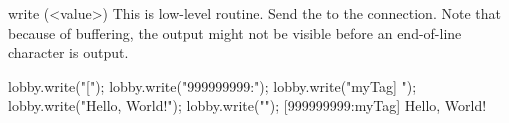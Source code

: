 \begin{urbiscriptapi}
\item[write](<value>)%
  This is low-level routine.  Send the  
  to the connection.  Note that because of buffering, the output might
  not be visible before an end-of-line character is output.
\begin{urbiscript}
lobby.write("[");
lobby.write("999999999:");
lobby.write("myTag] ");
lobby.write("Hello, World!");
lobby.write("\n");
[999999999:myTag] Hello, World!
\end{urbiscript}
\end{urbiscriptapi}

